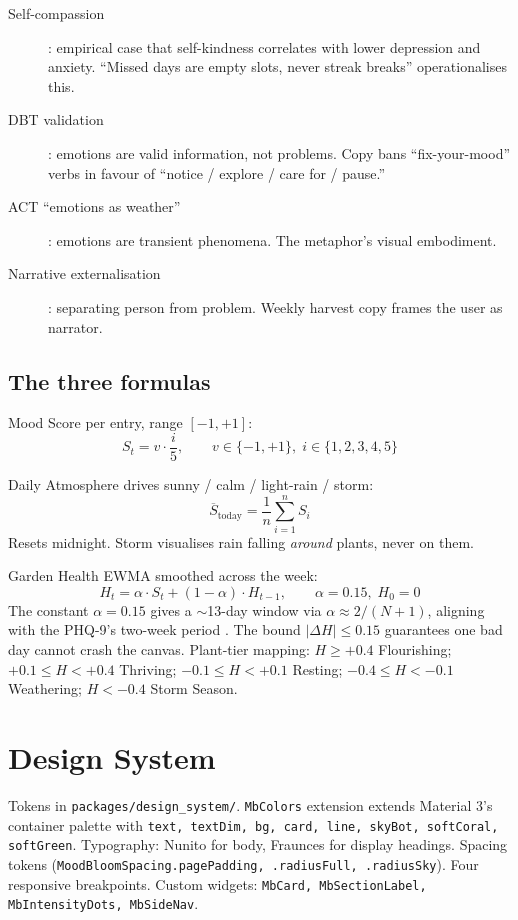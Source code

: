 \documentclass[11pt,a4paper]{article}
\begin{document}
\begin{description}
\item[Self-compassion] \autocite{neff2003selfcompassion,neff2023selfcompassion}: empirical case that self-kindness correlates with lower depression and anxiety. ``Missed days are empty slots, never streak breaks'' operationalises this.
\item[DBT validation] \autocite{linehan1993dbt}: emotions are valid information, not problems. Copy bans ``fix-your-mood'' verbs in favour of ``notice / explore / care for / pause.''
\item[ACT ``emotions as weather''] \autocite{hayes1999act}: emotions are transient phenomena. The metaphor's visual embodiment.
\item[Narrative externalisation] \autocite{white1990narrative,white2007maps}: separating person from problem. Weekly harvest copy frames the user as narrator.
\end{description}

\subsection{The three formulas}

Mood Score per entry, range $[-1, +1]$:
\[ S_t = v \cdot \frac{i}{5}, \qquad v \in \{-1, +1\}, \; i \in \{1, 2, 3, 4, 5\} \]

Daily Atmosphere drives sunny / calm / light-rain / storm:
\[ \overline{S}_{\text{today}} = \frac{1}{n} \sum_{i=1}^{n} S_i \]
Resets midnight. Storm visualises rain falling \emph{around} plants, never on them.

Garden Health EWMA smoothed across the week:
\[ H_t = \alpha \cdot S_t + (1 - \alpha) \cdot H_{t-1}, \qquad \alpha = 0.15, \; H_0 = 0 \]
The constant $\alpha = 0.15$ gives a $\sim$13-day window via
$\alpha \approx 2/(N+1)$, aligning with the PHQ-9's two-week period
\autocite{kroenke2001phq9,smit2022ewma}. The bound
$|\Delta H| \leq 0.15$ guarantees one bad day cannot crash the canvas.
Plant-tier mapping: $H \geq +0.4$ Flourishing; $+0.1 \leq H < +0.4$
Thriving; $-0.1 \leq H < +0.1$ Resting; $-0.4 \leq H < -0.1$ Weathering;
$H < -0.4$ Storm Season.

\section{Design System}

Tokens in \texttt{packages/design\_system/}. \texttt{MbColors} extension
extends Material 3's container palette with \texttt{text, textDim, bg,
card, line, skyBot, softCoral, softGreen}. Typography: Nunito for body,
Fraunces for display headings. Spacing tokens
(\texttt{MoodBloomSpacing.pagePadding, .radiusFull, .radiusSky}). Four
responsive breakpoints. Custom widgets: \texttt{MbCard, MbSectionLabel,
MbIntensityDots, MbSideNav}.
\end{document}

